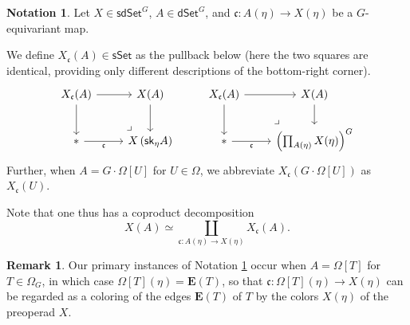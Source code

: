 \documentclass[a4paper,10pt
,draft
]{article}%
\numberwithin{equation}{section}
\numberwithin{figure}{section}
\theoremstyle{definition} %
\newtheorem{remark}[equation]{Remark}%
\newtheorem{notation}[equation]{Notation}%
\newcommand{\1}{\ensuremath{\mathbbm 1}}%
\begin{document}
\begin{notation}\label{XUDECALT NOT}
	Let $X \in \mathsf{sdSet}^G$, 
	$A \in \mathsf{dSet}^G$,
	and $\mathfrak{c} \colon A(\eta) \to X(\eta)$ 
	be a $G$-equivariant map.
	
	We define $X_{\mathfrak{c}}(A)\in \mathsf{sSet}$
	as the pullback	below
	(here the two squares are identical,
	providing only different descriptions of the bottom-right corner).
\begin{equation}\label{XUDECALT EQ}
\begin{tikzcd}
	X_{\mathfrak{c}}(A) \ar{r} \ar{d}
&
	X(A) \ar{d}
&%
	X_{\mathfrak{c}}(A) \ar{r} \ar{d}
&
	X(A) \ar{d}
\\
	\** \ar{r}[swap]{\mathfrak{c}} 
&
	X \left( \mathsf{sk}_{\eta} A \right)
	\arrow[lu, phantom, "\lrcorner", very near start]
&%
	\** \ar{r}[swap]{\mathfrak{c}} 
&
	\left(\prod_{A(\eta)} X(\eta)\right)^G
	\arrow[lu, phantom, "\lrcorner", very near start]
\end{tikzcd}
\end{equation}
Further, when $A = G \cdot \Omega[U]$
for $U \in \Omega$,
we abbreviate
$X_{\mathfrak{c}}(G \cdot \Omega[U])$
as 
$X_{\mathfrak{c}}(U)$.

Note that one thus has a coproduct decomposition
\begin{equation}
\label{COLDEC_EQ}
X(A) \simeq 
\coprod_{\mathfrak{c} \colon A(\eta) \to X(\eta)}
X_{\mathfrak{c}}(A).
\end{equation}
\end{notation}




\begin{remark}\label{PRIEX REM}
	Our primary instances of Notation \ref{XUDECALT NOT}
	occur when $A=\Omega[T]$ for $T \in \Omega_G$,
	in which case 
	$\Omega[T](\eta) = \boldsymbol{E}(T)$,
	so that
	$\mathfrak{c} \colon 
	\Omega[T](\eta) \to X(\eta)$
	can be regarded as a coloring of the edges 
	$\boldsymbol{E}(T)$
	of $T$ by the colors $X(\eta)$ of the preoperad $X$.
\end{remark}
\end{document}
